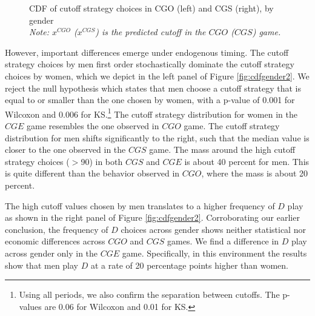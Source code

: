 \documentclass[11pt,english]{article}
\begin{document}
\begin{center}
\begin{figure}[ht]
\centering{}%
\begin{minipage}[t]{0.45\columnwidth}%
%
\end{minipage}%
\begin{minipage}[t]{0.45\columnwidth}%
%
\end{minipage} 
\caption{CDF of cutoff strategy choices in CGO (left) and CGS (right), by gender \\\footnotesize{\textit{Note: $x^{CGO}$ ($x^{CGS}$) is the predicted cutoff in the $CGO$ ($CGS$) game.}} }
\label{fig:cdfgender1}\end{figure}
\par\end{center}
However, important differences emerge under endogenous timing. The cutoff strategy choices by men first order stochastically dominate the cutoff strategy choices by women, which we depict in the left panel of Figure \ref{fig:cdfgender2}. We reject the null hypothesis which states that men choose a cutoff strategy that is equal to or smaller than the one chosen by women, with a p-value of 0.001 for Wilcoxon and 0.006 for KS.\footnote{Using all periods, we also confirm the separation between cutoffs. The p-values are 0.06 for Wilcoxon and 0.01 for KS.} The cutoff strategy distribution for women in the $CGE$ game resembles the one observed in $CGO$ game. The cutoff strategy distribution for men shifts significantly to the right, such that the median value is closer to the one observed in the $CGS$ game. The mass around the high cutoff strategy choices ($>$90) in both $CGS$ and $CGE$ is about 40 percent for men. This is quite different than the behavior observed in $CGO$, where the mass is about 20 percent. 

The high cutoff values chosen by men translates to a higher frequency of $D$ play as shown in the right panel of Figure \ref{fig:cdfgender2}. Corroborating our earlier conclusion, the frequency of $D$ choices across gender shows neither statistical nor economic differences across $CGO$ and $CGS$ games. We find a difference in $D$ play across gender only in the $CGE$ game. Specifically, in this environment the results show that men play $D$ at a rate of 20 percentage points higher than women. 
\end{document}
